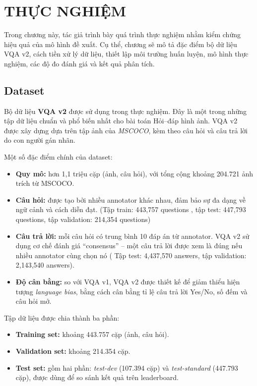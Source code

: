 \chapter{THỰC NGHIỆM}
\label{chap:chap4-experiment}

Trong chương này, tác giả trình bày quá trình thực nghiệm nhằm kiểm chứng hiệu quả của mô hình đề xuất. 
Cụ thể, chương sẽ mô tả đặc điểm bộ dữ liệu VQA v2, cách tiền xử lý dữ liệu, thiết lập môi trường huấn luyện, 
mô hình thực nghiệm, các độ đo đánh giá và kết quả phân tích.

\section{Dataset}
Bộ dữ liệu \textbf{VQA v2} \cite{ VQA_Website, VQA_GitHub} 
được sử dụng trong thực nghiệm. Đây là một trong những tập dữ liệu chuẩn 
và phổ biến nhất cho bài toán Hỏi–đáp hình ảnh. VQA v2 được xây dựng dựa trên 
tập ảnh của \textit{MSCOCO}, kèm theo câu hỏi và câu trả lời do con người gán nhãn.


Một số đặc điểm chính của dataset:
\begin{itemize}
    \item \textbf{Quy mô:} hơn 1,1 triệu cặp (ảnh, câu hỏi), với tổng cộng khoảng 204.721 ảnh trích từ MSCOCO.
    \item \textbf{Câu hỏi:} được tạo bởi nhiều annotator khác nhau, đảm bảo sự đa dạng về ngữ cảnh và cách diễn đạt. (Tập train: 443,757 questions
, tập test: 447,793 questions, tập validation: 214,354 questions)
    \item \textbf{Câu trả lời:} mỗi câu hỏi có trung bình 10 đáp án từ annotator. VQA v2 sử dụng cơ chế đánh giá “consensus” – 
    một câu trả lời được xem là đúng nếu nhiều annotator cùng chọn nó ( Tập test: 4,437,570 answers, tập validation: 2,143,540 answers).
    \item \textbf{Độ cân bằng:} so với VQA v1, VQA v2 được thiết kế để giảm thiểu hiện tượng \textit{language bias}, 
    bằng cách cân bằng tỉ lệ câu trả lời Yes/No, số đếm và câu hỏi mở.
\end{itemize}

Tập dữ liệu được chia thành ba phần:
\begin{itemize}
    \item \textbf{Training set:} khoảng 443.757 cặp (ảnh, câu hỏi).
    \item \textbf{Validation set:} khoảng 214.354 cặp.
    \item \textbf{Test set:} gồm hai phần: \textit{test-dev} (107.394 cặp) và \textit{test-standard} (447.793 cặp), 
    được dùng để so sánh kết quả trên leaderboard.
\end{itemize}

